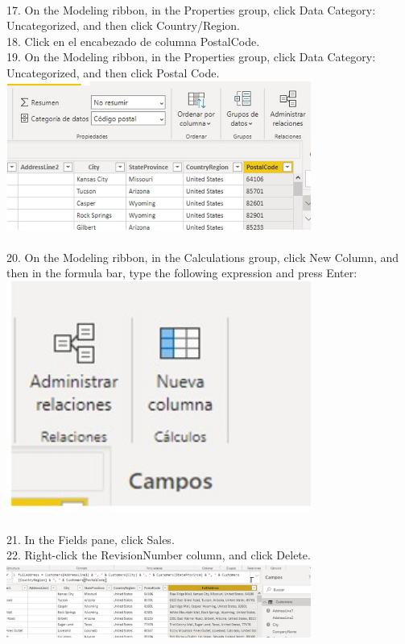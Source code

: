 \documentclass[preprint,12pt]{elsarticle}
\begin{document}
\begin{itemize}
		 		\\ 17. On the Modeling ribbon, in the Properties group, click Data Category: Uncategorized, and then click
		 		Country/Region.
		 		\\ 18. Click en el encabezado de columna PostalCode.
		 		\\ 19. On the Modeling ribbon, in the Properties group, click Data Category: Uncategorized, and then click Postal
		 		Code.
		 		\\ \includegraphics[width=10cm]{./IMAGENES/2.19} \\
		 		\\ 20. On the Modeling ribbon, in the Calculations group, click New Column, and then in the formula bar, type the
		 		following expression and press Enter:
		 		\\ \includegraphics[width=10cm]{./IMAGENES/2.20} \\
		 		\\ 21. In the Fields pane, click Sales.
		 		\\ 22. Right-click the RevisionNumber column, and click Delete.
		 		\\ \includegraphics[width=10cm]{./IMAGENES/2.21} \\

\end{itemize}
\end{document}

